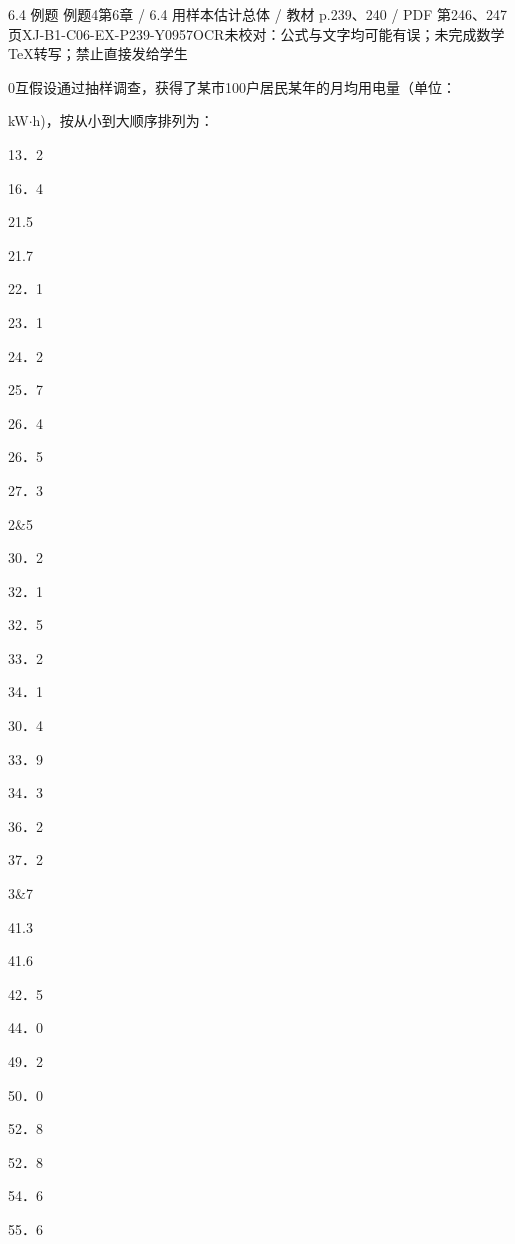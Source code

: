 \begin{bankitem}{6.4 例题 例题4}{第6章 / 6.4 用样本估计总体 / 教材 p.239、240 / PDF 第246、247页}{XJ-B1-C06-EX-P239-Y0957}{OCR未校对：公式与文字均可能有误；未完成数学TeX转写；禁止直接发给学生}
\begin{ocrdraft}
\par
0互假设通过抽样调查，获得了某市100户居民某年的月均用电量（单位：
\par
kW\ensuremath{\cdot}h)，按从小到大顺序排列为：
\par
13．2
\par
16．4
\par
21.5
\par
21.7
\par
22．1
\par
23．1
\par
24．2
\par
25．7
\par
26．4
\par
26．5
\par
27．3
\par
2\&5
\par
30．2
\par
32．1
\par
32．5
\par
33．2
\par
34．1
\par
30．4
\par
33．9
\par
34．3
\par
36．2
\par
37．2
\par
3\&7
\par
41.3
\par
41.6
\par
42．5
\par
44．0
\par
49．2
\par
50．0
\par
52．8
\par
52．8
\par
54．6
\par
55．6
\par

\end{ocrdraft}
\end{bankitem}

